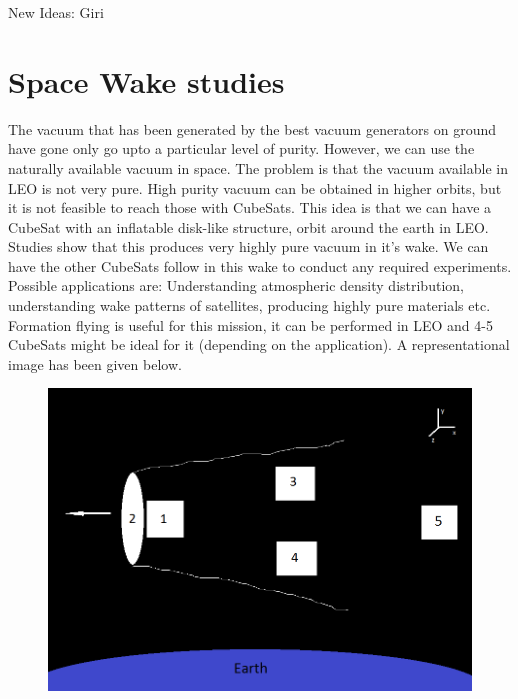 \documentclass[11pt,a4paper]{article}
\begin{document}
\begin{center}
{\Huge New Ideas: Giri}
\end{center}

\section{Space Wake studies}
The vacuum that has been generated by the best vacuum generators on ground have gone only go upto a particular level of purity. However, we can use the naturally available vacuum in space. The problem is that the vacuum available in LEO is not very pure. High purity vacuum can be obtained in higher orbits, but it is not feasible to reach those with CubeSats. This idea is that we can have a CubeSat with an inflatable disk-like structure, orbit around the earth in LEO. Studies show that this produces very highly pure vacuum in it's wake. We can have the other CubeSats follow in this wake to conduct any required experiments. Possible applications are: Understanding atmospheric density distribution, understanding wake patterns of satellites, producing highly pure materials etc. Formation flying is useful for this mission, it can be performed in LEO and 4-5 CubeSats might be ideal for it (depending on the application). A representational image has been given below. 

\begin{figure}[!ht]
\begin{center}
\includegraphics[scale=0.6]{wake_test.png}
\end{center}
\end{figure}
\end{document}
